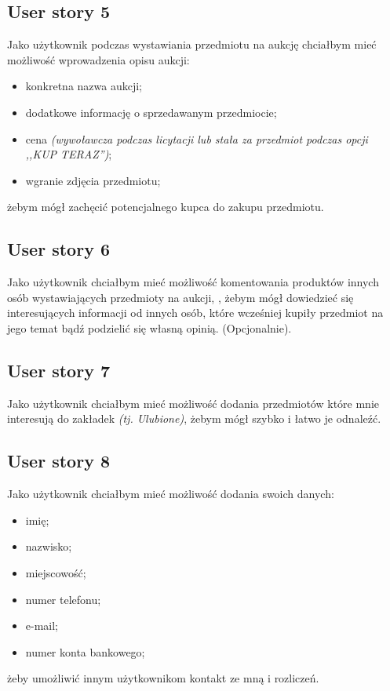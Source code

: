 \documentclass[a4paper]{article}
\begin{document}
	\subsection{User story 5}
	Jako użytkownik podczas wystawiania przedmiotu na aukcję chciałbym mieć możliwość wprowadzenia opisu aukcji:
	\begin{itemize}
		\item konkretna nazwa aukcji;
		\item dodatkowe informację o sprzedawanym przedmiocie;
		\item cena \emph{(wywoławcza podczas licytacji lub stała za przedmiot podczas opcji ,,KUP TERAZ'')};
		\item wgranie zdjęcia przedmiotu;
	\end{itemize}
	żebym mógł zachęcić potencjalnego kupca do zakupu przedmiotu.
	
	\subsection{User story 6}
	Jako użytkownik chciałbym mieć możliwość komentowania produktów innych osób wystawiających przedmioty na aukcji, , żebym mógł dowiedzieć się interesujących informacji od innych osób, które wcześniej kupiły przedmiot na jego temat bądź podzielić się własną opinią. (Opcjonalnie).
	
	\subsection{User story 7}
	Jako użytkownik chciałbym mieć możliwość dodania przedmiotów które mnie interesują do zakładek \emph{ (tj. Ulubione)}, żebym mógł szybko i łatwo je odnaleźć. 
	
	\subsection{User story 8}
	Jako użytkownik chciałbym mieć możliwość dodania swoich danych:
	\begin{itemize}
		\item imię;
		\item nazwisko;
		\item miejscowość;
		\item numer telefonu;
		\item e-mail;
		\item numer konta bankowego;
	\end{itemize}
	żeby umożliwić innym użytkownikom kontakt ze mną i rozliczeń.
	
\end{document}
